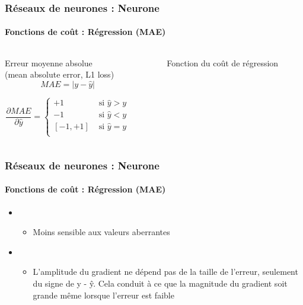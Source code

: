 \documentclass[xcolor=table]{beamer}
\begin{document}
\begin{frame}
\frametitle{Réseaux de neurones : Neurone}
\framesubtitle{Fonctions de coût : Régression (MAE)}

\begin{columns}
	\begin{column}{.68\linewidth}
		\begin{block}{Erreur moyenne absolue \\(mean absolute error, L1 loss)}
			\[MAE = |y - \hat{y}|\]
			
			\[
			\frac{\partial MAE}{\partial \hat{y}} = 
			\begin{cases}
			+1 & \text{ si } \hat{y} > y \\
			-1 & \text{ si } \hat{y} < y \\
			[-1, +1] & \text{ si } \hat{y} = y \\
			\end{cases}
			\]
		\end{block}
	\end{column}%
	\begin{column}{.3\linewidth}
		\begin{figure}
			\caption{Fonction du coût de régression \cite{2017-rosenberg}}
		\end{figure}
	\end{column}
\end{columns}

\end{frame}

\begin{frame}
\frametitle{Réseaux de neurones : Neurone}
\framesubtitle{Fonctions de coût : Régression (MAE)}

\begin{itemize}
	\item {}
	\begin{itemize}
		\item Moins sensible aux valeurs aberrantes
	\end{itemize}
	\item {}
	\begin{itemize}
		\item L'amplitude du gradient ne dépend pas de la taille de l'erreur, seulement du signe de y - ŷ. Cela conduit à ce que la magnitude du gradient soit grande même lorsque l'erreur est faible
	\end{itemize}
\end{itemize}

\end{frame}
\end{document}
